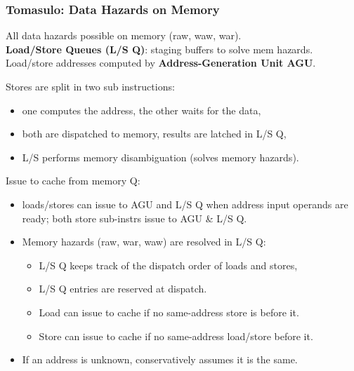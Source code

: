 \documentclass{beamer}
\newcommand{\emp}[1]{\textcolor{DikuRed}{ #1}}
\newcommand{\emphh}[1]{\textcolor{CosGreen}{ #1}}
\begin{document}
\begin{frame}[fragile,t]
\frametitle{Tomasulo: Data Hazards on Memory}

All data hazards possible on memory ({\sc raw}, {\sc waw}, {\sc war}).\\
\emp{\bf Load/Store Queues (L/S Q)}: staging buffers to solve mem hazards.\\
Load/store addresses computed by \emphh{\bf Address-Generation Unit AGU}.\medskip


\emp{Stores are split in two sub instructions:}
\begin{itemize}
    \item one computes the address, the other waits for the data,
    \item both are dispatched to memory, results are latched in L/S Q,
    \item L/S performs memory disambiguation (solves memory hazards).
\end  {itemize}
\medskip


\emp{Issue to cache from memory Q:}
\begin{itemize}
    \item loads/stores can issue to \emphh{AGU} and \emphh{L/S Q} when
            address input operands are ready; both store sub-instrs issue to \emphh{AGU \& L/S Q}.
    \item Memory hazards ({\sc raw}, {\sc war}, {\sc waw}) are resolved in L/S Q:
        \begin{itemize}
            \item L/S Q keeps track of the dispatch order of loads and stores,
            \item L/S Q entries are reserved at dispatch.
            \item Load can issue to cache if no same-address store is before it.
            \item Store can issue to cache if no same-address load/store before it.
        \end  {itemize}
    \item \alert{If an address is unknown, conservatively assumes it is the same.}
\end  {itemize}

\end{frame}
\end{document}
